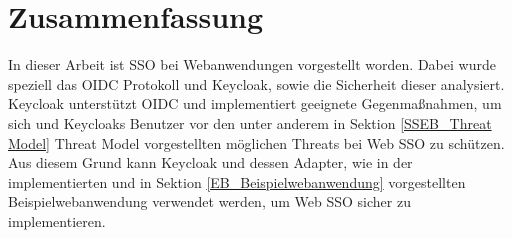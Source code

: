 \section{Zusammenfassung}

In dieser Arbeit ist SSO bei Webanwendungen vorgestellt worden. Dabei wurde speziell das OIDC Protokoll und Keycloak, sowie die Sicherheit dieser analysiert. Keycloak unterstützt OIDC und implementiert geeignete Gegenmaßnahmen, um sich und Keycloaks Benutzer vor den unter anderem in Sektion \ref{SSEB_Threat Model} Threat Model vorgestellten möglichen Threats bei Web SSO zu schützen. Aus diesem Grund kann Keycloak und dessen Adapter, wie in der implementierten und in Sektion \ref{EB_Beispielwebanwendung} vorgestellten Beispielwebanwendung verwendet werden, um Web SSO sicher zu implementieren.


